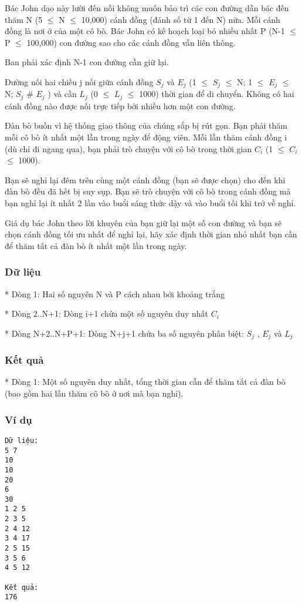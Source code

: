 



   Bác John dạo này lười đến nỗi không muốn bảo trì các con đường dẫn bác đến thăm N (5  $\le$  N  $\le$  10,000) cánh đồng (đánh số từ 1 đến N) nữa. Mỗi cánh đồng là nơi ở của một cô bò. Bác John có kế hoạch loại bỏ nhiều nhất P (N-1  $\le$  P  $\le$  100,000) con đường sao cho các cánh đồng vẫn liên thông.  

   Ban phải xác định N-1 con đường cần giữ lại.  

   Đường nối hai chiều j nối giữa cánh đồng $S_{j}$   và $E_{j}$   (1  $\le$  $S_{j}$    $\le$  N; 1  $\le$  $E_{j}$    $\le$  N; $S_{j}$   \# $E_{j}$   ) và cần $L_{j}$   (0  $\le$  $L_{j}$    $\le$  1000) thời gian để di chuyển. Không có hai cánh đồng nào được nối trực tiếp bởi nhiều hơn một con đường.  

   Đàn bò buồn vì hệ thống giao thông của chúng sắp bị rút gọn. Bạn phải thăm mỗi cô bò ít nhất một lần trong ngày để động viên. Mỗi lần thăm cánh đồng i (dù chỉ đi ngang qua), bạn phải trò chuyện với cô bò trong thời gian $C_{i}$   (1  $\le$  $C_{i}$    $\le$  1000).  

   Bạn sẽ nghỉ lại đêm trên cùng một cánh đồng (bạn sẽ được chọn) cho đến khi đàn bò đều đã hết bị suy sụp. Bạn sẽ trò chuyện với cô bò trong cánh đồng mà bạn nghỉ lại ít nhất 2 lần vào buổi sáng thức dậy và vào buổi tối khi trở về nghỉ.  

   Giả dụ bác John theo lời khuyên của bạn giữ lại một số con đường và bạn sẽ chọn cánh đồng tối ưu nhất để nghỉ lại, hãy xác định thời gian nhỏ nhất bạn cần để thăm tất cả đàn bò ít nhất một lần trong ngày.  

\subsubsection{   Dữ liệu  }

   * Dòng 1: Hai số nguyên N và P cách nhau bởi khoảng trắng  

   * Dòng 2..N+1: Dòng i+1 chứa một số nguyên duy nhất $C_{i}$

   * Dòng N+2..N+P+1: Dòng N+j+1 chứa ba số nguyên phân biệt: $S_{j}$   , $E_{j}$   và $L_{j}$

\subsubsection{   Kết quả  }

   * Dòng 1: Một số nguyên duy nhất, tổng thời gian cần để thăm tất cả đàn bò (bao gồm hai lần thăm cô bò ở nơi mà bạn nghỉ).  

\subsubsection{   Ví dụ  }
\begin{verbatim}
Dữ liệu:
5 7
10
10
20
6
30
1 2 5
2 3 5
2 4 12
3 4 17
2 5 15
3 5 6
4 5 12

Kết quả:
176
\end{verbatim}
